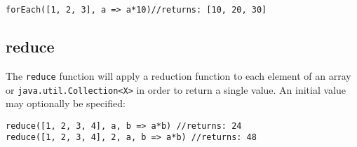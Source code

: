 \documentclass[conc-doc]{subfiles}
\begin{document}
\begin{lstlisting}
forEach([1, 2, 3], a => a*10)//returns: [10, 20, 30]
\end{lstlisting}

\subsection{reduce}
The \lstinline{reduce} function will apply a reduction function to each element of an array or \lstinline{java.util.Collection<X>} in order to return a single value. An initial value may optionally be specified:

\begin{lstlisting}
reduce([1, 2, 3, 4], a, b => a*b) //returns: 24
reduce([1, 2, 3, 4], 2, a, b => a*b) //returns: 48	
\end{lstlisting}
\end{document}
